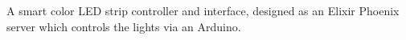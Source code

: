 \documentclass[11pt]{article}
\begin{document}
\begin{minipage}[t]{0.67\textwidth}
\begin{adjustwidth}{10pt}{}
    A smart color LED strip controller and interface, designed as an Elixir Phoenix server which controls the lights via an Arduino.
  \end{adjustwidth}


\end{minipage}
\end{document}
